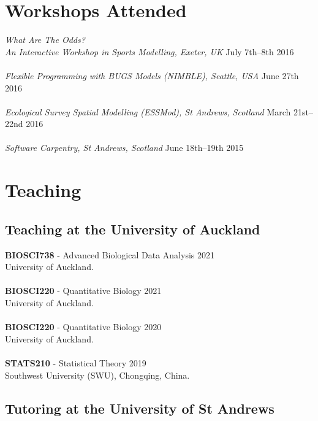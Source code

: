\documentclass[10pt,letter]{article}
\begin{document}
  
\section*{Workshops Attended}
\vspace{1mm}
{\sl What Are The Odds? \\ An Interactive Workshop in Sports Modelling, Exeter, UK} \hfill July 7th--8th 2016\\
\hdashrule[0.5ex]{4cm}{1pt}{1pt}\\
{\sl Flexible Programming with BUGS Models (NIMBLE), Seattle, USA} \hfill June 27th 2016\\
\hdashrule[0.5ex]{4cm}{1pt}{1pt}\\
{\sl Ecological Survey Spatial Modelling (ESSMod), St Andrews, Scotland} \hfill March 21st--22nd 2016\\
 \hdashrule[0.5ex]{4cm}{1pt}{1pt}\\
 {\sl Software Carpentry, St Andrews, Scotland} \hfill June 18th--19th 2015\\
 \newpage
 \section*{Teaching}
\vspace{1mm}
 \subsection*{Teaching at the University of Auckland}
 \vspace{1mm}
 \textbf{BIOSCI738} - Advanced Biological Data Analysis \hfill{2021} \\
 University of Auckland.\\
\hdashrule[0.5ex]{4cm}{1pt}{1pt}\\
 \textbf{BIOSCI220} - Quantitative Biology \hfill{2021} \\
 University of Auckland.\\
\hdashrule[0.5ex]{4cm}{1pt}{1pt}\\
 \textbf{BIOSCI220} - Quantitative Biology \hfill{2020} \\
 University of Auckland.\\
\hdashrule[0.5ex]{4cm}{1pt}{1pt}\\
 \textbf{STATS210} - Statistical Theory \hfill{2019} \\
 Southwest University (SWU), Chongqing, China.
 
\vspace{1mm}
 \subsection*{Tutoring at the University of St Andrews}
 \vspace{1mm}
 
\end{document}
